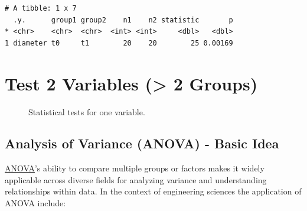 \documentclass[
  a4paper,
]{scrbook}
\begin{document}
\begin{verbatim}
# A tibble: 1 x 7
  .y.      group1 group2    n1    n2 statistic       p
* <chr>    <chr>  <chr>  <int> <int>     <dbl>   <dbl>
1 diameter t0     t1        20    20        25 0.00169
\end{verbatim}

\newpage{}

\section{Test 2 Variables (\textgreater{} 2
Groups)}\label{test-2-variables-2-groups-1}

\begin{figure}[H]


\caption{\label{fig-tests-TwoVar-nGrps}Statistical tests for one
variable.}

\end{figure}%

\subsection{Analysis of Variance (ANOVA) - Basic
Idea}\label{analysis-of-variance-anova---basic-idea}

\hyperref[anova]{ANOVA}'s ability to compare multiple groups or factors
makes it widely applicable across diverse fields for analyzing variance
and understanding relationships within data. In the context of
engineering sciences the application of ANOVA include:
\end{document}
